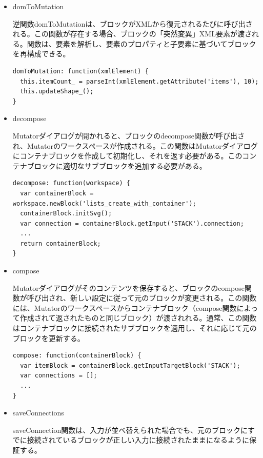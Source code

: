 \documentclass{risepaper}
\begin{document}
\begin{itemize}
\item domToMutation

逆関数domToMutationは、ブロックがXMLから復元されるたびに呼び出される。この関数が存在する場合、ブロックの「突然変異」XML要素が渡される。関数は、要素を解析し、要素のプロパティと子要素に基づいてブロックを再構成できる。

\begin{lstlisting}[basicstyle=\ttfamily\footnotesize]
domToMutation: function(xmlElement) {
  this.itemCount_ = parseInt(xmlElement.getAttribute('items'), 10);
  this.updateShape_();
}
\end{lstlisting}

\item decompose

Mutatorダイアログが開かれると、ブロックのdecompose関数が呼び出され、Mutatorのワークスペースが作成される。この関数はMutatorダイアログにコンテナブロックを作成して初期化し、それを返す必要がある。このコンテナブロックに適切なサブブロックを追加する必要がある。

\begin{lstlisting}[basicstyle=\ttfamily\footnotesize]
decompose: function(workspace) {
  var containerBlock = workspace.newBlock('lists_create_with_container');
  containerBlock.initSvg();
  var connection = containerBlock.getInput('STACK').connection;
  ...
  return containerBlock;
}
\end{lstlisting}

\item compose

Mutatorダイアログがそのコンテンツを保存すると、ブロックのcompose関数が呼び出され、新しい設定に従って元のブロックが変更される。この関数には、Mutatorのワークスペースからコンテナブロック（compose関数によって作成されて返されたものと同じブロック）が渡されれる。通常、この関数はコンテナブロックに接続されたサブブロックを適用し、それに応じて元のブロックを更新する。

\begin{lstlisting}[basicstyle=\ttfamily\footnotesize]
compose: function(containerBlock) {
  var itemBlock = containerBlock.getInputTargetBlock('STACK');
  var connections = [];
  ...
}
\end{lstlisting}

\item saveConnections

saveConnection関数は、入力が並べ替えられた場合でも、元のブロックにすでに接続されているブロックが正しい入力に接続されたままになるように保証する。


\end{itemize}
\end{document}
